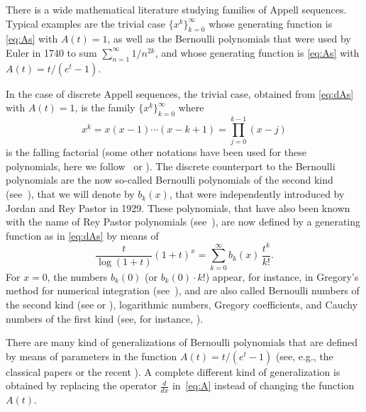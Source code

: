 \documentclass[11pt]{article}
\theoremstyle{plain}
\theoremstyle{remark}
\numberwithin{equation}{section} %
\begin{document}
There is a wide mathematical literature studying families of Appell sequences.
Typical examples are the trivial case $\{x^k\}_{k=0}^{\infty}$ 
whose generating function is \eqref{eq:As} with $A(t)=1$,
as well as the Bernoulli polynomials that were used by Euler in 1740 to sum 
$\sum_{n=1}^{\infty} 1/n^{2k}$, and whose generating function is
\eqref{eq:As} with $A(t)=t/(e^t-1)$.

In the case of discrete Appell sequences, the trivial case,
obtained from \eqref{eq:dAs} with $A(t)=1$,
is the family $\{x^{\underline{k}}\}_{k=0}^{\infty}$ where
\begin{equation}
\label{eq:ffact}
x^{\underline{k}} = x(x-1)  \cdots (x-k+1) = \prod_{j=0}^{k-1} (x-j)
\end{equation}
is the falling factorial (some other notations have been used
for these polynomials, here we follow~\cite{Knuth} or \cite[\S\,2.6, p.~47]{GKP}). 
The discrete counterpart to the Bernoulli polynomials are the now so-called 
Bernoulli polynomials of the second kind (see~\cite{Car}),
that we will denote by $b_k(x)$, 
that were independently 
introduced by Jordan \cite{Jor} and Rey Pastor \cite{RP-BSMA} in 1929.
These polynomials, that have also been known with the name of Rey Pastor polynomials
(see~\cite{Bab}), are now defined by a generating function as in \eqref{eq:dAs} 
by means of 
\begin{equation}
\label{eq:fungenAn}
  \frac{t}{\log(1+t)}(1+t)^x = \sum_{k=0}^\infty b_k(x) \, \frac{t^k}{k!}.
\end{equation}
For $x=0$, the numbers $b_k(0)$ (or $b_k(0) \cdot k!$) appear, for instance, 
in Gregory's method for numerical integration (see~\cite{Ph}), and are also
called Bernoulli numbers of the second kind 
(see \cite[\S\,24.16]{Dil-NIST} or \cite{WuPan}), 
logarithmic numbers, Gregory coefficients, and 
Cauchy numbers of the first kind (see, for instance, \cite{MSV, Zh}).

There are many kind of generalizations of Bernoulli polynomials
that are defined by means of parameters in the function $A(t) = t/(e^t-1)$
(see, e.g., the classical papers
\cite{Ap, Nor} or the recent \cite{AdLe, NRV-Brno, Tem}). 
A complete different kind of generalization is obtained by replacing
the operator $\frac{d}{dx}$ in~\eqref{eq:A} instead of changing
the function~$A(t)$.
\end{document}
